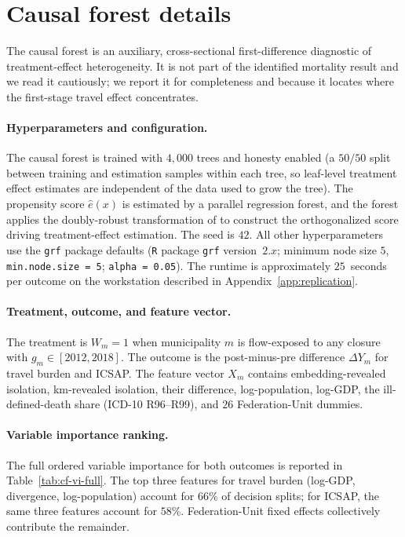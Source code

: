 \section{Causal forest details}
\label{app:cf}

The causal forest is an auxiliary, cross-sectional first-difference
diagnostic of treatment-effect heterogeneity. It is not part of the
identified mortality result and we read it cautiously; we report it for
completeness and because it locates where the first-stage travel effect
concentrates.

\paragraph{Hyperparameters and configuration.} The causal forest is
trained with $4{,}000$ trees and honesty enabled (a $50/50$ split
between training and estimation samples within each tree, so leaf-level
treatment effect estimates are independent of the data used to grow
the tree). The propensity score $\widehat{e}(x)$ is estimated by a
parallel regression forest, and the forest applies the doubly-robust
transformation of \citet{wagerAthey2018} to construct the
orthogonalized score driving treatment-effect estimation. The seed is
$42$. All other hyperparameters use the \texttt{grf} package defaults
(\texttt{R} package \texttt{grf} version~$2.x$; minimum node size $5$,
\texttt{min.node.size = 5}; \texttt{alpha = 0.05}). The runtime is
approximately $25$~seconds per outcome on the workstation described in
Appendix~\ref{app:replication}.

\paragraph{Treatment, outcome, and feature vector.} The treatment is
$W_m = 1$ when municipality $m$ is flow-exposed to any closure with
$g_m \in [2012, 2018]$. The outcome is the post-minus-pre difference
$\Delta Y_m$ for travel burden and ICSAP. The feature vector $X_m$
contains embedding-revealed isolation, km-revealed isolation, their
difference, log-population, log-GDP, the ill-defined-death share
(ICD-10 R96--R99), and $26$ Federation-Unit dummies.

\paragraph{Variable importance ranking.} The full ordered variable
importance for both outcomes is reported in
Table~\ref{tab:cf-vi-full}. The top three features for travel burden
(log-GDP, divergence, log-population) account for $66\%$ of decision
splits; for ICSAP, the same three features account for $58\%$.
Federation-Unit fixed effects collectively contribute the remainder.

